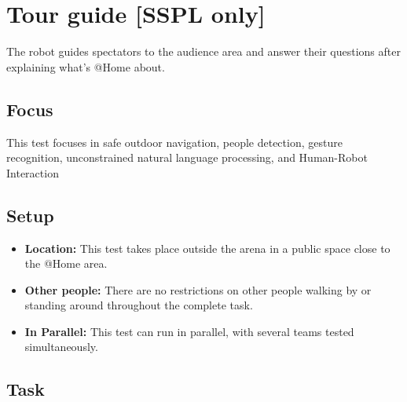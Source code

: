 \section{Tour guide [SSPL only]}
The robot guides spectators to the audience area and answer their questions after explaining what's @Home about.

\subsection{Focus}
This test focuses in safe outdoor navigation, people detection, gesture recognition, unconstrained natural language processing, and Human-Robot Interaction

\subsection{Setup}
\begin{itemize}
	\item \textbf{Location:} This test takes place outside the arena in a public space close to the @Home area.

	\item \textbf{Other people:} There are no restrictions on other people walking by or standing around throughout the complete task.

	\item \textbf{In Parallel:} This test can run in parallel, with several teams tested simultaneously.
\end{itemize}

\subsection{Task}


